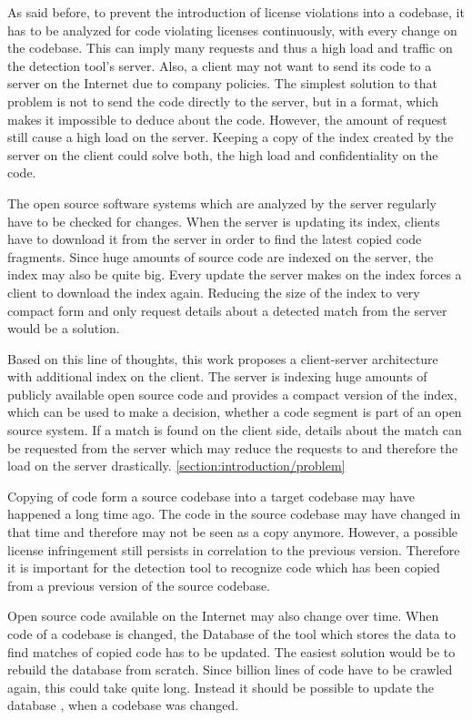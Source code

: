 As said before, to prevent the introduction of license violations into a codebase, it has to be analyzed for code violating licenses continuously, with every change on the codebase.
This can imply many requests and thus a high load and traffic on the detection tool's server.
Also, a client may not want to send its code to a server on the Internet due to company policies.
The simplest solution to that problem is not to send the code directly to the server, but in a format, which makes it impossible to deduce about the code.
However, the amount of request still cause a high load on the server.
Keeping a copy of the index created by the server on the client could solve both, the high load and confidentiality on the code.

The open source software systems which are analyzed by the server regularly have to be checked for changes.
When the server is updating its index, clients have to download it from the server in order to find the latest copied code fragments.
Since huge amounts of source code are indexed on the server, the index may also be quite big.
Every update the server makes on the index forces a client to download the index again.
Reducing the size of the index to very compact form and only request details about a detected match from the server would be a solution.

Based on this line of thoughts, this work proposes a client-server architecture with additional index on the client.
The server is indexing huge amounts of publicly available open source code and provides a compact version of the index, which can be used to make a decision, whether a code segment is part of an open source system.
If a match is found on the client side, details about the match can be requested from the server which may reduce the requests to and therefore the load on the server drastically. \autoref{section:introduction/problem}

Copying of code form a source codebase into a target codebase may have happened a long time ago.
The code in the source codebase may have changed in that time and therefore may not be seen as a copy anymore.
However, a possible license infringement still persists in correlation to the previous version.
Therefore it is important for the detection tool to recognize code which has been copied from a previous version of the source codebase.

Open source code available on the Internet may also change over time.
When code of a codebase is changed, the Database of the tool which stores the data to find matches of copied code has to be updated.
The easiest solution would be to rebuild the database from scratch.
Since billion lines of code have to be crawled again, this could take quite long.
Instead it should be possible to update the database , when a codebase was changed.

